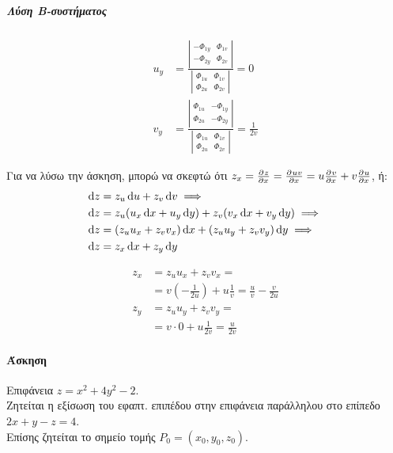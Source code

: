 \documentclass[11pt,a4paper,titlepage,draft]{article}
\begin{document}
\subparagraph{Λύση Β-συστήματος}
\begin{align*}
u_y&=\frac{\left|
	\begin{matrix}
	-\Phi_{1y} & \Phi_{1v} \\
	-\Phi_{2y} & \Phi_{2v}
	\end{matrix}
	\right|
}{\left|\begin{matrix}
\Phi_{1u} & \Phi_{1v} \\
\Phi_{2u} & \Phi_{2v}
\end{matrix}
\right|}
 = 0
\\
v_y &= \frac{\left|
	\begin{matrix}
	\Phi_{1u} &-\Phi_{1y} \\
	\Phi_{2u} &-\Phi_{2y}
	\end{matrix}
	\right|
}{\left|\begin{matrix}
\Phi_{1u} & \Phi_{1v} \\
\Phi_{2u} & \Phi_{2v}
\end{matrix}
\right|} = \frac{1}{2v}
\end{align*}

Για να λύσω την άσκηση, μπορώ να σκεφτώ ότι \( z_x=\pd{z}{x} = \pd{uv}{x} = u\pd{v}{x}+v\pd{u}{x} \), ή:
\begin{align*}
\dif z &= z_u\dif u + z_v\dif v \implies \\
\dif z &= z_u(u_x\dif x+u_y\dif y)+z_v(v_x\dif x+v_y\dif y) \implies \\
\dif z &= (z_uu_x+z_vv_x)\dif x+(z_uu_y+z_vv_y)\dif y \implies \\
\dif z &= z_x\dif x + z_y\dif y
\end{align*}

\begin{align*}
z_x &= z_uu_x+z_vv_x = \\
    &= v \left(-\frac{1}{2u} \right)+u\frac{1}{v}=\frac{u}{v}-\frac{v}{2u}
    \\
z_y &= z_uu_y+z_vv_y = \\
&= v \cdot 0 +u\frac{1}{2v}=\frac{u}{2v}
\end{align*}

\paragraph{Άσκηση}
Επιφάνεια \( z=x^2+4y^2-2 \).\\
Ζητείται η εξίσωση του εφαπτ. επιπέδου στην επιφάνεια παράλληλου στο επίπεδο \( 2x+y-z=4 \).\\
Επίσης ζητείται το σημείο τομής \( P_0 = (x_0,y_0,z_0) \).
\end{document}
